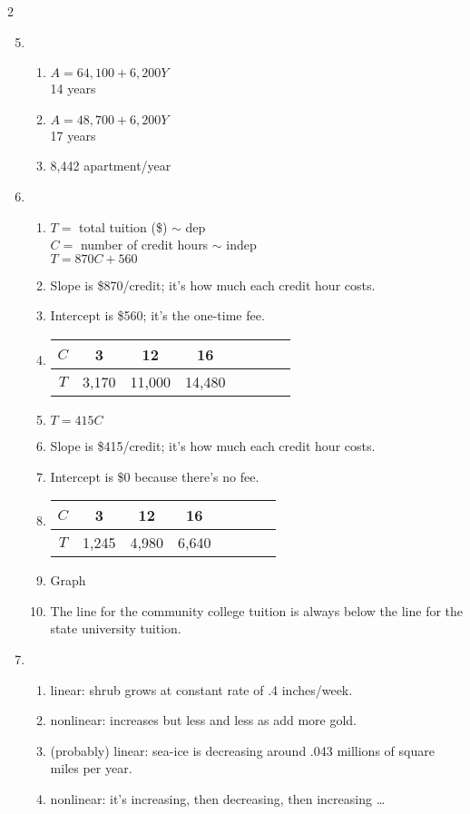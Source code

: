 \begin{multicols} {2}
\begin{enumerate}
\setcounter{enumi}{4}

\item %
\begin{enumerate}
\item $A=64,100+6,200Y$ \\ 14 years
\item $A=48,700+6,200Y$ \\ 17 years
\item 8,442 apartment/year
\end{enumerate}

\item %
\begin{enumerate}
\item $T=$ total tuition (\$) $\sim$ dep \\ $C=$ number of credit hours $\sim$ indep \\ $T = 870C+560$
\item Slope is \$870/credit; it's how much each credit hour costs.
\item Intercept is \$560; it's the one-time fee.
\item \begin{tabular} {|c| |c|c |c|c |c|c |c|}\hline
$C$ & 3 & 12 & 16 \\ \hline
$T$ & 3,170 & 11,000 & 14,480  \\ \hline
\end{tabular}
\item $T=415C$
\item Slope is \$415/credit; it's how much each credit hour costs.
\item Intercept is \$0 because there's no fee.
\item \begin{tabular} {|c| |c|c |c|c |c|c |c|}\hline
$C$ & 3 & 12 & 16 \\ \hline
$T$ & 1,245 & 4,980 & 6,640  \\ \hline
\end{tabular}
\item Graph
\item The line for the community college tuition is always below the line for the state university tuition.
\end{enumerate}

\item \begin{enumerate}
\item %
linear:  shrub grows at constant rate of .4 inches/week.
\item %
nonlinear:  increases but less and less as add more gold.
\item %
(probably) linear: sea-ice is decreasing around .043 millions of square miles per year.  
\item %
nonlinear: it's increasing, then decreasing, then increasing \ldots
\end{enumerate}


\end{enumerate}
\end{multicols}
